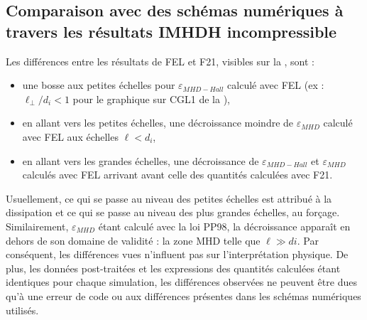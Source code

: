 \subsection{Comparaison avec des schémas numériques à travers les résultats \acs{IMHDH} incompressible}

Les différences entre les résultats de \ac{FEL} et \ac{F21}, visibles sur la , sont : 
\begin{itemize}
    \item une bosse aux petites échelles pour $\varepsilon_{MHD-Hall}$ calculé avec \ac{FEL} (ex : $\ell_{\perp}/d_i < 1$ pour le graphique sur CGL1 de la ),
    \item en allant vers les petites échelles, une décroissance moindre de $\varepsilon_{MHD}$ calculé avec \ac{FEL} aux échelles $\ell < d_i$, 
    \item en allant vers les grandes échelles, une décroissance de $\varepsilon_{MHD-Hall}$ et $\varepsilon_{MHD}$ calculés avec \ac{FEL} arrivant avant celle des quantités calculées avec \ac{F21}.
\end{itemize}
Usuellement, ce qui se passe au niveau des petites échelles est attribué à la dissipation et ce qui se passe au niveau des plus grandes échelles, au forçage. Similairement,  $\varepsilon_{MHD}$ étant calculé avec la loi \acs{PP98}, la décroissance apparaît en dehors de son domaine de validité : la zone \ac{MHD} telle que $\ell \gg di$. Par conséquent, les différences vues n'influent pas sur l'interprétation physique. De plus, les données post-traitées et les expressions des quantités calculées étant identiques pour chaque simulation, les différences observées ne peuvent être dues qu'à une erreur de code ou aux différences présentes dans les schémas numériques utilisés. 

